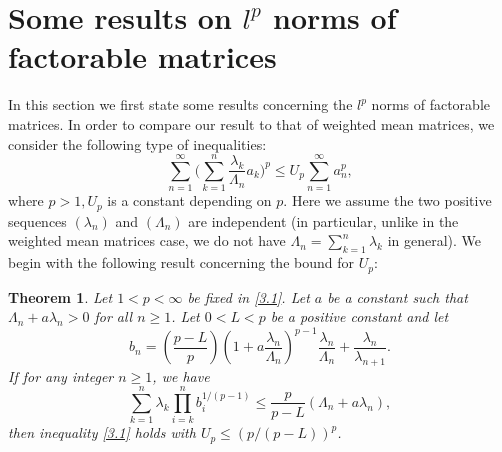 \documentclass[11pt]{amsart}
\newtheorem{theorem}{Theorem}[section]
\numberwithin{equation}{section}
\theoremstyle{definition}
\theoremstyle{remark}
\begin{document}
\section{Some results on $l^p$ norms of factorable matrices }
\label{sec3} \setcounter{equation}{0}
  In this section we first state some results concerning the $l^p$ norms
    of factorable matrices. In order to compare our result to that of weighted mean matrices, we consider the following type of inequalities:
\begin{equation}
\label{3.1}
   \sum^{\infty}_{n=1}\Big (\sum^n_{k=1}\frac
   {\lambda_k}{\Lambda_n}a_k \Big )^p \leq
   U_p\sum^{\infty}_{n=1}a^p_n,
\end{equation}
   where $p>1, U_p$ is a constant depending on $p$.
    Here we assume the two positive sequences $(\lambda_n)$ and
    $(\Lambda_n)$ are independent (in particular, unlike in the
    weighted mean matrices case, we do not have
    $\Lambda_n=\sum^n_{k=1}\lambda_k$ in general).
    We begin with the following result concerning the bound for
    $U_p$:
\begin{theorem}
\label{thm3.1}
  Let $1<p<\infty$ be fixed in \eqref{3.1}. Let $a$ be a constant such that $\Lambda_n+a\lambda_n>0$ for all $n \geq 1$.
  Let $0<L<p$ be a positive constant and let
\begin{equation*}
  b_n=( \frac {p-L}{p} )(1+a\frac
  {\lambda_n}{\Lambda_n})^{p-1}\frac {\lambda_n}{\Lambda_n}+\frac
  {\lambda_n}{\lambda_{n+1}}.
\end{equation*}
  If for any integer $n \geq 1$, we have
\begin{equation*}
    \sum^n_{k=1}\lambda_k\prod^{n}_{i=k}b^{1/(p-1)}_i \leq
     \frac {p}{p-L}(\Lambda_n+ a \lambda_n),
\end{equation*}
    then inequality \eqref{3.1} holds with $U_{p} \leq (p/(p-L))^p$.
\end{theorem}
\end{document}
